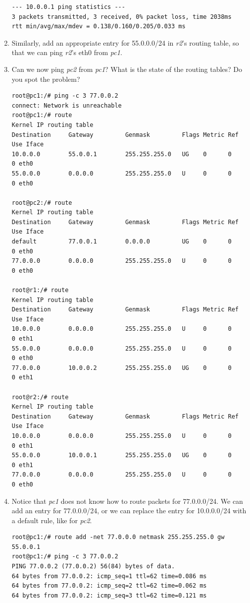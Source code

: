 \documentclass[12pt]{book}
\begin{document}
\begin{enumerate}[resume*]
\begin{lstlisting}
--- 10.0.0.1 ping statistics ---
3 packets transmitted, 3 received, 0% packet loss, time 2038ms
rtt min/avg/max/mdev = 0.138/0.160/0.205/0.033 ms
  \end{lstlisting}

\item Similarly, add an appropriate entry for 55.0.0.0/24 in \emph{r2}'s routing table, so that we can ping \emph{r2}'s eth0 from \emph{pc1}. 

\item Can we now ping \emph{pc2} from \emph{pc1}? What is the state of the routing tables? Do you spot the problem?
  \begin{lstlisting}
root@pc1:/# ping -c 3 77.0.0.2
connect: Network is unreachable
root@pc1:/# route
Kernel IP routing table
Destination     Gateway         Genmask         Flags Metric Ref    Use Iface
10.0.0.0        55.0.0.1        255.255.255.0   UG    0      0        0 eth0
55.0.0.0        0.0.0.0         255.255.255.0   U     0      0        0 eth0

root@pc2:/# route
Kernel IP routing table
Destination     Gateway         Genmask         Flags Metric Ref    Use Iface
default         77.0.0.1        0.0.0.0         UG    0      0        0 eth0
77.0.0.0        0.0.0.0         255.255.255.0   U     0      0        0 eth0

root@r1:/# route
Kernel IP routing table
Destination     Gateway         Genmask         Flags Metric Ref    Use Iface
10.0.0.0        0.0.0.0         255.255.255.0   U     0      0        0 eth1
55.0.0.0        0.0.0.0         255.255.255.0   U     0      0        0 eth0
77.0.0.0        10.0.0.2        255.255.255.0   UG    0      0        0 eth1

root@r2:/# route
Kernel IP routing table
Destination     Gateway         Genmask         Flags Metric Ref    Use Iface
10.0.0.0        0.0.0.0         255.255.255.0   U     0      0        0 eth1
55.0.0.0        10.0.0.1        255.255.255.0   UG    0      0        0 eth1
77.0.0.0        0.0.0.0         255.255.255.0   U     0      0        0 eth0
  \end{lstlisting}

\item Notice that \emph{pc1} does not know how to route packets for 77.0.0.0/24. We can add an entry for 77.0.0.0/24, or we can replace the entry for 10.0.0.0/24 with a default rule, like for \emph{pc2}.
  \begin{lstlisting}
root@pc1:/# route add -net 77.0.0.0 netmask 255.255.255.0 gw 55.0.0.1
root@pc1:/# ping -c 3 77.0.0.2
PING 77.0.0.2 (77.0.0.2) 56(84) bytes of data.
64 bytes from 77.0.0.2: icmp_seq=1 ttl=62 time=0.086 ms
64 bytes from 77.0.0.2: icmp_seq=2 ttl=62 time=0.062 ms
64 bytes from 77.0.0.2: icmp_seq=3 ttl=62 time=0.121 ms


\end{lstlisting}
\end{enumerate}
\end{document}

